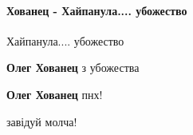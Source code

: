  
 
 
 
 
\paragraph{Хованец - Хайпанула.... убожество}

\begin{itemize}
 
Хайпанула.... убожество

\begin{itemize}
 
\textbf{Олег Хованец} з убожества

 
\textbf{Олег Хованец} пнх!

 
завідуй молча! 🤣

 

\end{itemize}
\end{itemize}
